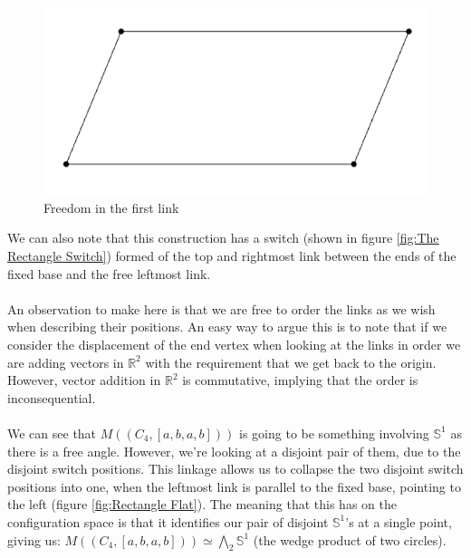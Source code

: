 \documentclass{article}
\begin{document}
\begin{figure}[h!]
\centering
\includegraphics[scale=0.4]{./images/rectangle_skewed.png}
\caption{Freedom in the first link}
\label{fig:Rectangle Skewed}
\end{figure}

\noindent We can also note that this construction has a switch (shown in figure \ref{fig:The Rectangle Switch}) formed of the top and rightmost link between the ends of the fixed base and the free leftmost link. \\\\ An observation to make here is that we are free to order the links as we wish when describing their positions. An easy way to argue this is to note that if we consider the displacement of the end vertex when looking at the links in order we are adding vectors in $\mathbb R^2$ with the requirement that we get back to the origin. However, vector addition in $\mathbb R^2$ is commutative, implying that the order is inconsequential. \noindent \\\\ We can see that $M((C_4,[a,b,a,b]))$ is going to be something involving $\mathbb S^1$ as there is a free angle. However, we're looking at a disjoint pair of them, due to the disjoint switch positions. This linkage allows us to collapse the two disjoint switch positions into one, when the leftmost link is parallel to the fixed base, pointing to the left (figure \ref{fig:Rectangle Flat}). The meaning that this has on the configuration space is that it identifies our pair of disjoint $\mathbb S^1$'s at a single point, giving us: $M((C_4,[a,b,a,b])) \simeq \bigwedge_2 \mathbb S^1$ (the wedge product of two circles).
\end{document}
